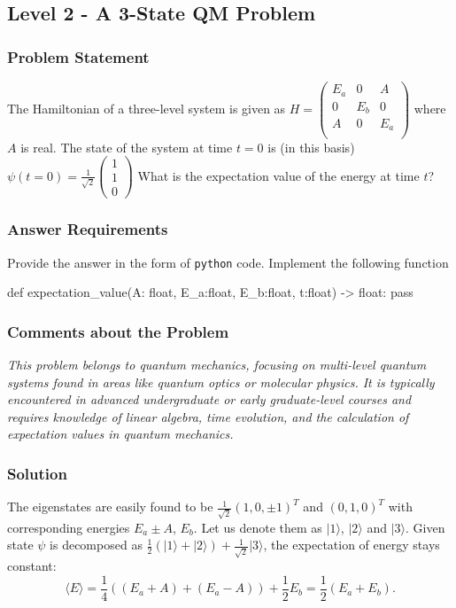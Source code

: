 \clearpage

\subsection{Level 2 - A 3-State QM Problem}


\subsubsection*{Problem Statement}
The Hamiltonian of a three-level system is given as $H = \begin{pmatrix}
    E_a & 0 & A \\
    0 & E_b & 0 \\
    A & 0 & E_a \\
\end{pmatrix}$ where $A$ is real. The state of the system at time $t=0$ is (in this basis) $\psi(t=0) = \frac{1}{\sqrt{2}}\begin{pmatrix}1 \\
1\\
0\end{pmatrix}$ What is the expectation value of the energy at time $t$?

\subsubsection*{Answer Requirements}
Provide the answer in the form of \texttt{python} code. Implement the following function
\begin{python}
def expectation_value(A: float, E_a:float, E_b:float, t:float) -> float:
    pass
\end{python}

\subsubsection*{Comments about the Problem}
\textit{This problem belongs to quantum mechanics, focusing on multi-level quantum systems found in areas like quantum optics or molecular physics. It is typically encountered in advanced undergraduate or early graduate-level courses and requires knowledge of linear algebra, time evolution, and the calculation of expectation values in quantum mechanics.}


\subsubsection*{Solution}
The eigenstates are easily found to be $\frac{1}{\sqrt{2}}(1,0,\pm 1)^T$ and $(0,1,0)^T$ with corresponding energies $E_a\pm A$, $E_b$. Let us denote them as $|1\rangle$, $|2\rangle$ and $|3\rangle$. Given state $\psi$ is decomposed as $\frac{1}{2}(|1\rangle +|2\rangle) + \frac{1}{\sqrt{2}}|3\rangle$, the expectation of energy stays constant: 
\begin{equation}
    \langle E\rangle = \frac{1}{4}((E_a+A)+(E_a-A)) + \frac{1}{2}E_b =\boxed{ \frac{1}{2}(E_a+E_b)}.
\end{equation}





